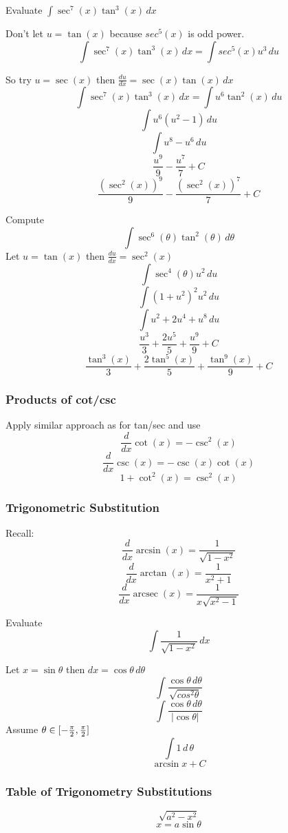 \documentclass[english, 12pt]{article}
\DeclareMathOperator{\arcsec}{arcsec}
\begin{document}
\begin{exmp}
Evaluate $\int \sec^7(x) \tan^3(x)\,dx$

Don't let $u=\tan(x)$ because $sec^5(x)$ is odd power.
\[\int \sec^7(x) \tan^3(x)\,dx = \int sec^5(x)u^3\,du\]

So try $u = \sec(x)$ then $\frac{du}{dx}= \sec(x)\tan(x)\,dx$
\[\int \sec^7(x) \tan^3(x)\,dx = \int u^6 \tan^2(x)\,du\]
\[\int u^6 (u^2 -1)\,du\]
\[\int u^8 - u^6 \,du\]
\[\frac{u^9}{9} - \frac{u^7}{7} + C\]
\[\frac{(\sec^2(x))^9}{9} - \frac{(\sec^2(x))^7}{7} + C\]
\end{exmp}

\begin{exercise}
Compute
\[\int \sec^6(\theta)\tan^2(\theta)\,d\theta\]
Let $u=\tan(x)$ then $\frac{du}{dx}= \sec^2(x)$
\[\int \sec^4(\theta)u^2\,du\]
\[\int (1+u^2)^2 u^2\,du\]
\[\int u^2+2u^4+u^8\,du\]
\[\frac{u^3}{3} + \frac{2u^5}{5} + \frac{u^9}{9} + C\]
\[\frac{\tan^3(x)}{3} + \frac{2\tan^5(x)}{5} + \frac{\tan^9(x)}{9} + C\]
\end{exercise}
\subsubsection*{Products of cot/csc}
Apply similar approach as for tan/sec and use 
\[\frac{d}{dx}\cot(x)=-\csc^2(x)\]
\[\frac{d}{dx}\csc(x)=-\csc(x)\cot(x)\]
\[ 1 + \cot^2(x)=\csc^2(x)\]

\subsubsection{Trigonometric Substitution}
Recall: 
\[ \frac{d}{dx} \arcsin(x) = \frac{1}{\sqrt{1-x^2}} \]
\[ \frac{d}{dx}\arctan(x)=\frac{1}{x^2+1} \]
\[ \frac{d}{dx} \arcsec(x)=\frac{1}{x \sqrt{x^2-1}} \]

\begin{exmp}
Evaluate 
\[\int \frac{1}{\sqrt{1-x^2}}\,dx\]
\begin{sol}
Let $x = \sin \theta$ then $dx = \cos \theta\,d\theta$
\[ \int \frac{\cos\theta \,d\theta}{\sqrt{cos^2\theta}} \]
\[ \int \frac{\cos\theta \,d\theta}{|\cos\theta |} \]
Assume $\theta \in [-\frac{\pi}{2} , \frac{\pi}{2} ] $
\[ \int 1 \,d\,\theta \]
\[ \arcsin x + C \]

\end{sol}

\end{exmp}



\subsubsection{Table of Trigonometry Substitutions}
\[\sqrt{a^2-x^2} \]
\[x = a \sin \theta \]
\end{document}
